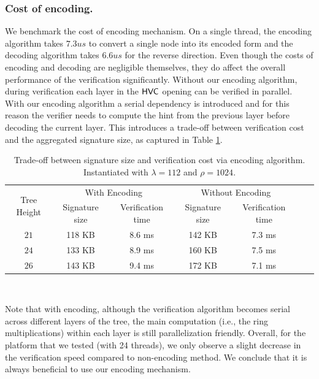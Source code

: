 \subsubsection{Cost of encoding.}
We benchmark the cost of encoding mechanism. 
On a single thread, the encoding algorithm takes $7.3 us$ to convert a single node into its encoded form and the decoding algorithm takes $6.6 us$ for the reverse direction.
Even though the costs of encoding and decoding are negligible themselves, they do affect the overall performance of the verification significantly.
Without our encoding algorithm, during verification each layer in the $\mathsf{HVC}$ opening can be verified in parallel.
With our encoding algorithm a serial dependency is introduced and for this reason the verifier needs to compute the hint from the previous layer before decoding the current layer.
This introduces a trade-off between verification cost and the aggregated signature size, as captured in Table \ref{tab:encode_trade_off}.
\begin{table}[t]\centering
  \begin{tabular}{c|cc|cccc}
    \multirow{2}{*}{Tree Height}   &  \multicolumn{2}{c|}{With Encoding}      & \multicolumn{2}{c}{Without Encoding}  \\\cline{2-5}
                  &   Signature size  & Verification time & Signature size    & Verification time                     \\\toprule
      $21$        &       118 KB      &        8.6 ms     &    142 KB         &      7.3 ms                           \\
      $24$        &       133 KB      &        8.9 ms     &    160 KB         &      7.5 ms                           \\
      $26$        &       143 KB      &        9.4 ms     &    172 KB         &      7.1 ms                           \\\bottomrule

  \end{tabular}\\
  \caption{Trade-off between signature size and verification cost via encoding algorithm. Instantiated with $\lambda = 112$ and $\rho = 1024$.}
  \label{tab:encode_trade_off}
\end{table}

Note that with encoding, although the verification algorithm becomes serial across different layers of the tree, the main computation (i.e., the ring multiplications) within each layer is still parallelization friendly.
Overall, for the platform that we tested (with 24 threads), we only observe a slight decrease in the verification speed compared to non-encoding method. 
We conclude that it is always beneficial to use our encoding mechanism.


